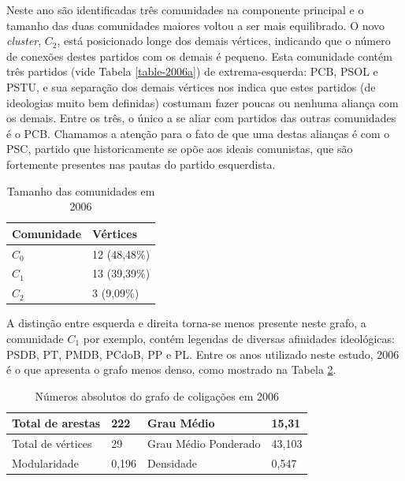 Neste ano são identificadas três comunidades na componente principal e o tamanho das duas comunidades maiores voltou a ser mais equilibrado. O novo \emph{cluster}, $C_2$, está posicionado longe dos demais vértices, indicando que o número de conexões destes partidos com  os demais é pequeno. Esta comunidade contém três partidos (vide Tabela \eqref{table-2006a}) de extrema-esquerda: \gls{PCB}, \gls{PSOL} e \gls{PSTU}, e sua separação dos demais vértices nos indica que estes partidos (de ideologias muito bem definidas) costumam fazer poucas ou nenhuma aliança com os demais. Entre os três, o único a se aliar com partidos das outras comunidades é o \gls{PCB}. Chamamos a atenção para o fato de que uma destas alianças é com o \gls{PSC}, partido que historicamente se opõe aos ideais comunistas, que são fortemente presentes nas pautas do partido esquerdista.

\begin{table}[H]
\centering
\label{table-2006a}
\begin{tabular}{|l|l|}
\hline
Comunidade & Vértices \\ \hline
$C_0$         &      12 (48,48\%)                \\ \hline
$C_1$         &     13 (39,39\%)                \\ \hline
$C_2$         &       3 (9,09\%)               \\ \hline
\end{tabular}
\caption{Tamanho das comunidades em 2006}
\end{table}

A distinção entre esquerda e direita torna-se menos presente neste grafo, a comunidade $C_1$ por exemplo, contém legendas de diversas afinidades ideológicas: \gls{PSDB}, \gls{PT}, \gls{PMDB}, \gls{PCdoB}, \gls{PP} e \gls{PL}. Entre os anos utilizado neste estudo, 2006 é o que apresenta o grafo menos denso, como mostrado na Tabela \ref{table-2006b}.

\begin{table}[H]
\centering
\label{table-2006b}
\begin{tabular}{|l|l|l|l|}
\hline
Total de arestas  & 222 & Grau Médio           & 15,31 \\ \hline
Total de vértices & 29 & Grau Médio Ponderado & 43,103 \\ \hline
Modularidade      & 0,196 & Densidade            & 0,547 \\ \hline
\end{tabular}
\caption{Números absolutos do grafo de coligações em 2006}
\end{table}

